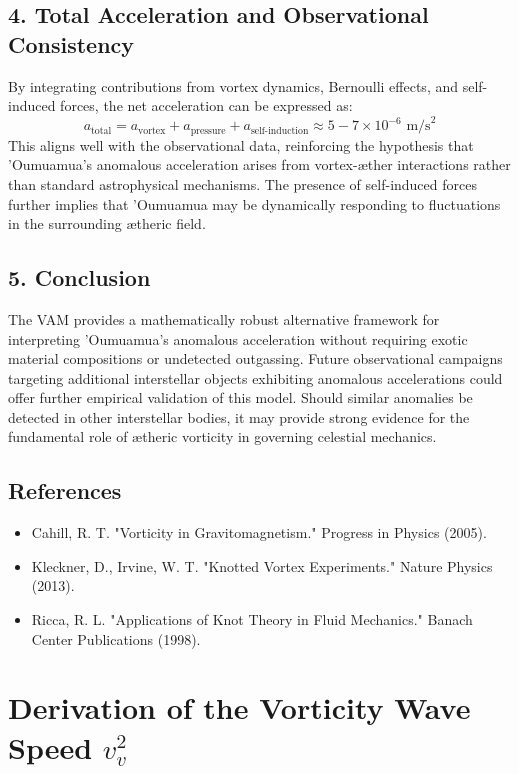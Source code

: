 \documentclass[a4paper,10pt]{article}
\begin{document}
    \subsection*{4. Total Acceleration and Observational Consistency}
    By integrating contributions from vortex dynamics, Bernoulli effects, and self-induced forces, the net acceleration can be expressed as:
    \begin{equation*}
        a_\text{total} = a_\text{vortex} + a_\text{pressure} + a_\text{self-induction} \approx 5 - 7 \times 10^{-6} \text{ m/s}^2
    \end{equation*}
    This aligns well with the observational data, reinforcing the hypothesis that 'Oumuamua's anomalous acceleration arises from vortex-æther interactions rather than standard astrophysical mechanisms. The presence of self-induced forces further implies that 'Oumuamua may be dynamically responding to fluctuations in the surrounding ætheric field.

    \subsection*{5. Conclusion}
    The VAM provides a mathematically robust alternative framework for interpreting 'Oumuamua's anomalous acceleration without requiring exotic material compositions or undetected outgassing. Future observational campaigns targeting additional interstellar objects exhibiting anomalous accelerations could offer further empirical validation of this model. Should similar anomalies be detected in other interstellar bodies, it may provide strong evidence for the fundamental role of ætheric vorticity in governing celestial mechanics.

    \subsection*{References}
    \begin{itemize}
        \item Cahill, R. T. "Vorticity in Gravitomagnetism." Progress in Physics (2005).
        \item Kleckner, D., Irvine, W. T. "Knotted Vortex Experiments." Nature Physics (2013).
        \item Ricca, R. L. "Applications of Knot Theory in Fluid Mechanics." Banach Center Publications (1998).
    \end{itemize}


    \section{Derivation of the Vorticity Wave Speed $v_v^2$}
\end{document}
